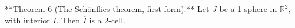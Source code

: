 **Theorem 6 (The Schönflies theorem, first form).** Let $J$ be a 1-sphere in $\mathbb{R}^2$, with interior $I$. Then $\overline{I}$ is a 2-cell.
